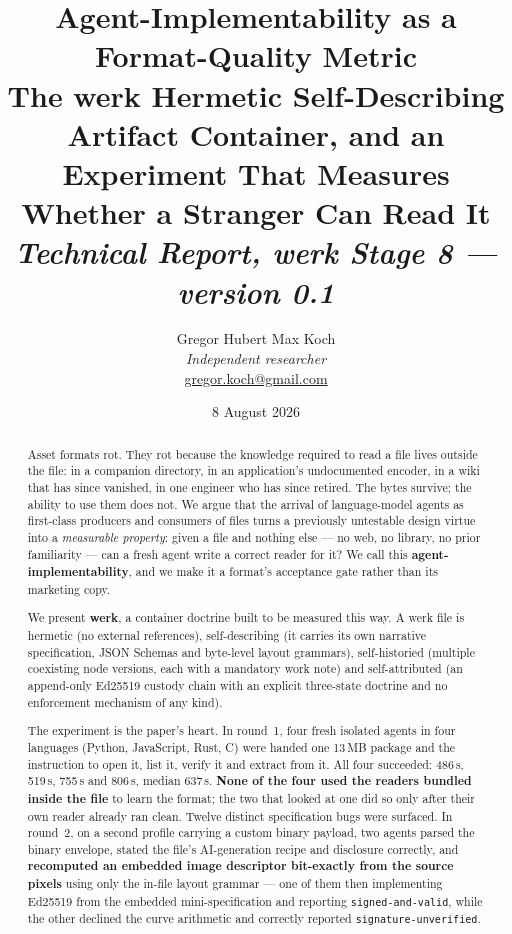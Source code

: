 \documentclass[10pt,twocolumn,letterpaper]{article}
\title{%
  \vspace{-2.0em}
  {\bfseries\huge Agent-Implementability as a Format-Quality Metric}\\[0.35em]
  {\large The werk Hermetic Self-Describing Artifact Container, and an Experiment
   That Measures Whether a Stranger Can Read It}\\[0.5em]
  {\normalsize\itshape Technical Report, werk Stage 8 --- version 0.1}%
}
\author{%
  Gregor Hubert Max Koch\\
  {\small\itshape Independent researcher}\\
  {\small\href{mailto:gregor.koch@gmail.com}{gregor.koch@gmail.com}}%
}
\date{8 August 2026}
\newcommand{\code}[1]{\texttt{\small #1}}
\begin{document}
\maketitle

\begin{abstract}
\noindent
Asset formats rot. They rot because the knowledge required to read a file lives
outside the file: in a companion directory, in an application's undocumented
encoder, in a wiki that has since vanished, in one engineer who has since
retired. The bytes survive; the ability to use them does not. We argue that the
arrival of language-model agents as first-class producers and consumers of files
turns a previously untestable design virtue into a \emph{measurable property}:
given a file and nothing else --- no web, no library, no prior familiarity ---
can a fresh agent write a correct reader for it? We call this
\textbf{agent-implementability}, and we make it a format's acceptance gate rather
than its marketing copy.

We present \textbf{werk}, a container doctrine built to be measured this way.
A werk file is hermetic (no external references), self-describing (it carries its
own narrative specification, JSON Schemas and byte-level layout grammars),
self-historied (multiple coexisting node versions, each with a mandatory work
note) and self-attributed (an append-only Ed25519 custody chain with an explicit
three-state doctrine and no enforcement mechanism of any kind).

The experiment is the paper's heart. In round~1, four fresh isolated agents in
four languages (Python, JavaScript, Rust, C) were handed one 13\,MB package and
the instruction to open it, list it, verify it and extract from it. All four
succeeded: 486\,s, 519\,s, 755\,s and 806\,s, median 637\,s. \textbf{None of the
four used the readers bundled inside the file} to learn the format; the two that
looked at one did so only after their own reader already ran clean. Twelve
distinct specification bugs were surfaced. In round~2, on a second profile
carrying a custom binary payload, two agents parsed the binary envelope, stated
the file's AI-generation recipe and disclosure correctly, and
\textbf{recomputed an embedded image descriptor bit-exactly from the source
pixels} using only the in-file layout grammar --- one of them then implementing
Ed25519 from the embedded mini-specification and reporting
\code{signed-and-valid}, while the other declined the curve arithmetic and
correctly reported \code{signature-unverified}.


\end{abstract}
\end{document}
